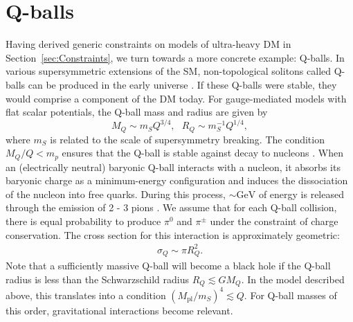 \documentclass[twocolumn,showpacs,preprintnumbers,amsmath,amssymb,prd]{revtex4}
\begin{document}
\section{Q-balls}
\label{sec:QBalls}

Having derived generic constraints on models of ultra-heavy DM in Section~\ref{sec:Constraints}, we turn towards a more concrete example: Q-balls.
In various supersymmetric extensions of the SM, non-topological solitons called Q-balls can be produced in the early universe \cite{Coleman:1985ki, Kusenko:1997si}.
If these Q-balls were stable, they would comprise a component of the DM today.
For gauge-mediated models with flat scalar potentials, the Q-ball mass and radius are given by
\begin{equation}
\label{eq:Qballprop}
M_Q \sim m_S Q^{3/4}, ~~~ R_Q \sim m_S^{-1} Q^{1/4},
\end{equation}
where $m_S$ is related to the scale of supersymmetry breaking.
The condition $M_Q/Q < m_p$ ensures that the Q-ball is stable against decay to nucleons \cite{Dine:2003ax}.
When an (electrically neutral) baryonic Q-ball interacts with a nucleon, it absorbs its baryonic charge as a minimum-energy configuration and induces the dissociation of the nucleon into free quarks.
During this process, $\sim \text{GeV}$ of energy is released through the emission of 2 - 3 pions \cite{Dine:2003ax}.
We assume that for each Q-ball collision, there is equal probability to produce $\pi^0$ and $\pi^\pm$ under the constraint of charge conservation.
The cross section for this interaction is approximately geometric:
\begin{align}
\sigma_Q \sim \pi R_Q^2.
\end{align}
Note that a sufficiently massive Q-ball will become a black hole if the Q-ball radius is less than the Schwarzschild radius $R_Q \lesssim G M_Q$.
In the model described above, this translates into a condition $(M_\text{pl}/m_S)^4 \lesssim Q$.
For Q-ball masses of this order, gravitational interactions become relevant.
\end{document}
